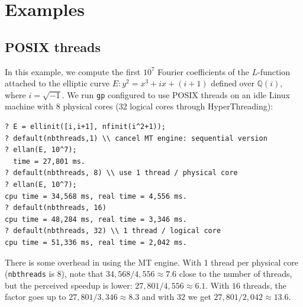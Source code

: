 \documentclass{deliverablereport}
\begin{document}
\section{Examples}

\subsection{POSIX threads}

In this example, we compute the first $10^7$ Fourier coefficients of the
$L$-function attached to the elliptic curve $E: y^2 = x^3 + ix + (i+1)$
defined over $\mathbb{Q}(i)$, where $i = \sqrt{-1}$. We run \texttt{gp}
configured to use POSIX threads on an idle Linux machine with 8 physical
cores (32 logical cores through HyperThreading):
\begin{verbatim}
? E = ellinit([i,i+1], nfinit(i^2+1));
? default(nbthreads,1) \\ cancel MT engine: sequential version
? ellan(E, 10^7);
  time = 27,801 ms.
? default(nbthreads, 8) \\ use 1 thread / physical core
? ellan(E, 10^7);
cpu time = 34,568 ms, real time = 4,556 ms.
? default(nbthreads, 16)
cpu time = 48,284 ms, real time = 3,346 ms.
? default(nbthreads, 32) \\ 1 thread / logical core
cpu time = 51,336 ms, real time = 2,042 ms.
\end{verbatim}
There is some overhead in using the MT engine. With 1 thread per physical
core (\texttt{nbthreads} is 8), note that $34,568/4,556 \approx 7.6$ close to
the number of threads, but the perceived speedup is lower: $27,801/4,556
\approx 6.1$. With $16$ threads, the factor goes up to $27,801/ 3,346 \approx
8.3$ and with $32$ we get $27,801/ 2,042 \approx 13.6$.

\begin{center}
\end{center}
\end{document}
